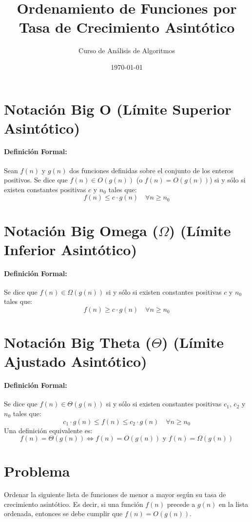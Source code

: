 \documentclass[12pt, a4paper]{article}
\title{\textbf{Ordenamiento de Funciones por Tasa de Crecimiento Asintótico}}
\author{Curso de Análisis de Algoritmos}
\date{\today}
\theoremstyle{definition}
\begin{document}
\section*{Notaci\'{o}n Big O (L\'{i}mite Superior Asint\'{o}tico)}

\paragraph{Definici\'{o}n Formal:}
Sean \(f(n)\) y \(g(n)\) dos funciones definidas sobre el conjunto de los enteros positivos. Se dice que \(f(n) \in O(g(n))\) (o \(f(n) = O(g(n))\)) si y s\'{o}lo si existen constantes positivas \(c\) y \(n_0\) tales que:
\[ f(n) \leq c \cdot g(n) \quad \forall n \geq n_0 \]

\section*{Notaci\'{o}n Big Omega (\(\Omega\)) (L\'{i}mite Inferior Asint\'{o}tico)}

\paragraph{Definici\'{o}n Formal:}
Se dice que \(f(n) \in \Omega(g(n))\) si y s\'{o}lo si existen constantes positivas \(c\) y \(n_0\) tales que:
\[ f(n) \geq c \cdot g(n) \quad \forall n \geq n_0 \]

\section*{Notaci\'{o}n Big Theta (\(\Theta\)) (L\'{i}mite Ajustado Asint\'{o}tico)}

\paragraph{Definici\'{o}n Formal:}
Se dice que \(f(n) \in \Theta(g(n))\) si y s\'{o}lo si existen constantes positivas \(c_1\), \(c_2\) y \(n_0\) tales que:
\[ c_1 \cdot g(n) \leq f(n) \leq c_2 \cdot g(n) \quad \forall n \geq n_0 \]
Una definici\'{o}n equivalente es:
\[ f(n) = \Theta(g(n)) \iff f(n) = O(g(n)) \text{ y } f(n) = \Omega(g(n)) \]




\section{Problema}

Ordenar la siguiente lista de funciones de menor a mayor según su tasa de crecimiento asintótico. Es decir, si una función $f(n)$ precede a $g(n)$ en la lista ordenada, entonces se debe cumplir que $f(n) = O(g(n))$.
\end{document}
